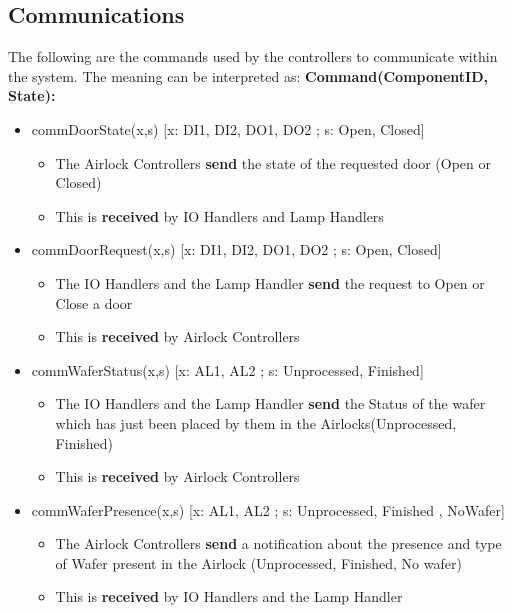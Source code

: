 \documentclass[a4paper,12pt]{article}
\begin{document}
	\subsection {Communications}
	The following are the commands used by the controllers to communicate within the system. The meaning can be interpreted as: 
	\bigskip
	\newline 
	\textbf{Command(ComponentID, State):}
	\begin{itemize}
		\item commDoorState(x,s) [x: DI1, DI2, DO1, DO2 ; s: Open, Closed] 
		\begin{itemize}
			\item The Airlock Controllers \textbf{send} the state of the requested door (Open or Closed)
			\item This is \textbf{received} by IO Handlers and Lamp Handlers
		\end{itemize}
		\bigskip
		
		\item commDoorRequest(x,s) [x: DI1, DI2, DO1, DO2 ; s: Open, Closed]
		\begin{itemize}
			\item The IO Handlers and the Lamp Handler \textbf{send} the request to Open or Close a door 
			\item This is \textbf{received} by Airlock Controllers
		\end{itemize}
		\bigskip
		
		\item commWaferStatus(x,s) [x: AL1, AL2 ; s: Unprocessed, Finished]
		\begin{itemize}
			\item The IO Handlers and the Lamp Handler \textbf{send} the Status of the wafer which has just been placed by them in the Airlocks(Unprocessed, Finished) 
			\item This is \textbf{received} by Airlock Controllers
		\end{itemize}
		\bigskip
		
		\item commWaferPresence(x,s) [x: AL1, AL2 ; s: Unprocessed, Finished , NoWafer]
		\begin{itemize}
			\item The Airlock Controllers \textbf{send} a notification about the presence and type of Wafer present in the Airlock (Unprocessed, Finished, No wafer) 
			\item This is \textbf{received} by IO Handlers and the Lamp Handler
		\end{itemize}
	\end{itemize}
	\newpage
\end{document}
